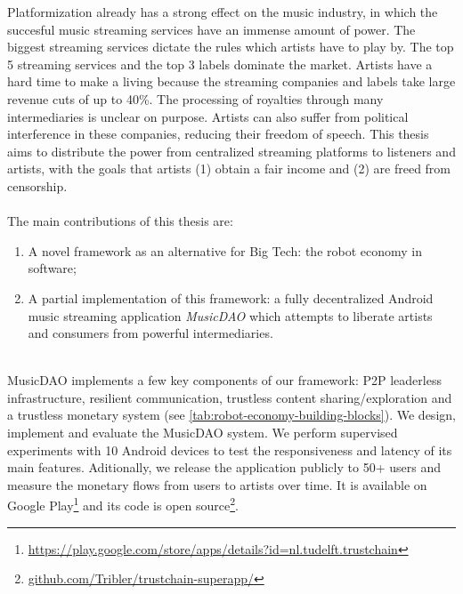Platformization already has a strong effect on the music industry, in which the succesful music streaming services have an immense amount of power. The biggest streaming services dictate the rules which artists have to play by. The top 5 streaming services and the top 3 labels dominate the market.
Artists have a hard time to make a living because the streaming companies and labels take large revenue cuts of up to 40\%. The processing of royalties through many intermediaries is unclear on purpose. Artists can also suffer from political interference in these companies, reducing their freedom of speech. This thesis aims to distribute the power from centralized streaming platforms to listeners and artists, with the goals that artists (1) obtain a fair income and (2) are freed from censorship. 
\\
\\
The main contributions of this thesis are:
\begin{enumerate}
    \item A novel framework as an alternative for Big Tech: the robot economy in software;
    \item A partial implementation of this framework: a fully decentralized Android music streaming application \textit{MusicDAO} which attempts to liberate artists and consumers from powerful intermediaries.
\end{enumerate}
\\
MusicDAO implements a few key components of our framework: P2P leaderless infrastructure, resilient communication, trustless content sharing/exploration and a trustless monetary system (see \ref{tab:robot-economy-building-blocks}). We design, implement and evaluate the MusicDAO system. We perform supervised experiments with 10 Android devices to test the responsiveness and latency of its main features. Aditionally, we release the application publicly to 50+ users and measure the monetary flows from users to artists over time. 
It is available on Google Play\footnote{\url{https://play.google.com/store/apps/details?id=nl.tudelft.trustchain}} and its code is open source\footnote{\url{github.com/Tribler/trustchain-superapp/}}.




